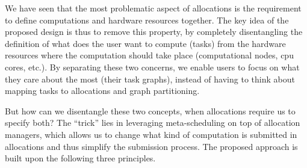We have seen that the most problematic aspect of allocations is the requirement to define
computations and hardware resources together. The key idea of the proposed design is thus to remove this
property, by completely disentangling the definition of what does the user want to compute (tasks)
from the hardware resources where the computation should take place (computational nodes,
\gls{cpu} cores, etc.). By separating these two concerns, we enable users to focus on
what they care about the most (their task graphs), instead of having to think about mapping tasks to allocations
and graph partitioning.

But how can we disentangle these two concepts, when allocations require us to specify both? The
``trick'' lies in leveraging meta-scheduling on top of allocation managers, which allows us to
change what kind of computation is submitted in allocations and thus simplify the submission process.
The proposed approach is built upon the following three principles.

